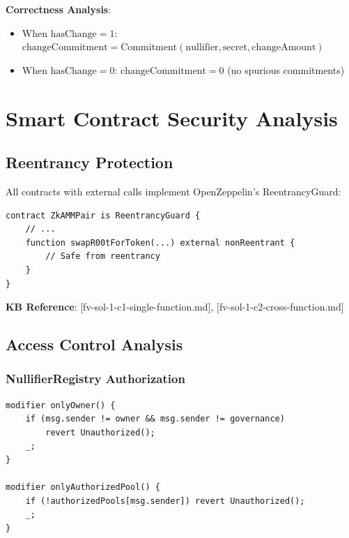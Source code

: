 \documentclass[11pt,a4paper]{article}
\begin{document}
\textbf{Correctness Analysis}:
\begin{itemize}
    \item When $\text{hasChange} = 1$: $\text{changeCommitment} = \text{Commitment}(\text{nullifier}, \text{secret}, \text{changeAmount})$
    \item When $\text{hasChange} = 0$: $\text{changeCommitment} = 0$ (no spurious commitments)
\end{itemize}

\section{Smart Contract Security Analysis}

\subsection{Reentrancy Protection}

All contracts with external calls implement OpenZeppelin's ReentrancyGuard:

\begin{lstlisting}[style=solidity, caption={ReentrancyGuard Usage (ZkAMMPair.sol:16)}]
contract ZkAMMPair is ReentrancyGuard {
    // ...
    function swapR00tForToken(...) external nonReentrant {
        // Safe from reentrancy
    }
}
\end{lstlisting}

\textbf{KB Reference}: [fv-sol-1-c1-single-function.md], [fv-sol-1-c2-cross-function.md]

\subsection{Access Control Analysis}

\subsubsection{NullifierRegistry Authorization}

\begin{lstlisting}[style=solidity, caption={NullifierRegistry Access Control (NullifierRegistry.sol:47-55)}]
modifier onlyOwner() {
    if (msg.sender != owner && msg.sender != governance)
        revert Unauthorized();
    _;
}

modifier onlyAuthorizedPool() {
    if (!authorizedPools[msg.sender]) revert Unauthorized();
    _;
}
\end{lstlisting}
\end{document}
